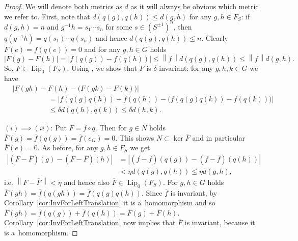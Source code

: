 \documentclass[11pt,a4paper]{amsart}
\theoremstyle{definition}
\newcommand{\fBar}{\overline{f}}
\newcommand{\FBar}{\overline{F}}
\newcommand{\abs}[1]{\left| #1 \right|}
\newcommand{\norm}[1]{\left\| #1 \right\|}
\newcommand{\Lipz}{\operatorname{Lip}_0}
\begin{document}
	\begin{proof}
		We will denote both metrics as $d$ as it will always be obvious which metric we refer to. First, note that $d(q(g), q(h)) \leq d(g, h)$ for any $g, h \in F_S$: if $d(g, h) = n$ and $g^{-1}h = s_1 \cdots s_n$ for some $s \in (S^{\pm1})^n$, then $q(g^{-1}h) = q(s_1)\cdots q(s_n)$ and hence $d(q(g), q(h)) \leq n$.
		Clearly $F(e) = f(q(e)) = 0$ and for any $g, h \in G$ holds
		\begin{equation*}
			\abs{F(g) - F(h)} = \abs{f(q(g)) - f(q(h))} \leq \norm{f} d(q(g), q(h)) \leq \norm{f} d(g, h).
		\end{equation*}
		So, $F \in \Lipz(F_S)$. Using , we show that $F$ is $\delta$-invariant: for any $g, h, k \in G$ we have
		\begin{align*}
			&\abs{F(gh) - F(h) - \big(F(gk) - F(k)\big)}\\
			&\hspace{5em}= \abs{f(q(g)q(h)) - f(q(h)) - \big(f(q(g)q(k)) - f(q(k))\big)}\\
			&\hspace{5em}\leq \delta d(q(h), q(k))
			\leq \delta d(h, k).
		\end{align*}
		
		$(i) \implies (ii)$: Put $\FBar = \fBar \circ q$. Then for $g \in N$ holds $\FBar(g) = \fBar(q(g)) = \fBar(e_G) = 0$. This shows $N \subset \ker \FBar$ and in particular $\FBar(e) = 0$. As before, for any $g, h \in F_S$ we get
		\begin{align*}
			\abs{(F - \FBar)(g) - (F - \FBar)(h)}
			&= \abs{(f - \fBar)(q(g)) - (f - \fBar)(q(h))} \\
			&< \eta d(q(g), q(h))
			\leq \eta d(g,h),
		\end{align*}
		i.e. $\norm{F - \FBar} < \eta$ and hence also $\FBar \in \Lipz(F_S)$. For $g,h \in G$ holds $\FBar(gh) = \fBar(q(gh)) = \fBar(q(g)q(h))$. Since $\fBar$ is invariant, by Corollary~\ref{cor:InvForLeftTranslation} it is a~homomorphism and so $\FBar(gh) = \fBar(q(g)) + \fBar(q(h)) = \FBar(g) + \FBar(h)$. Corollary~\ref{cor:InvForLeftTranslation} now implies that $\FBar$ is invariant, because it is a~homomorphism.
		

\end{proof}
\end{document}
